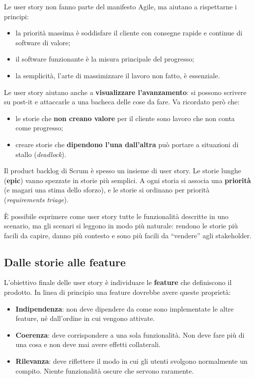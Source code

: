 Le user story non fanno parte del manifesto Agile, ma aiutano a
rispettarne i principi:

\begin{itemize}
\tightlist
\item
  la priorità massima è soddisfare il cliente con consegne rapide e
  continue di software di valore;
\item
  il software funzionante è la misura principale del progresso;
\item
  la semplicità, l'arte di massimizzare il lavoro non fatto, è
  essenziale.
\end{itemize}

Le user story aiutano anche a \textbf{visualizzare l'avanzamento}: si
possono scrivere su post-it e attaccarle a una bacheca delle cose da
fare. Va ricordato però che:

\begin{itemize}
\tightlist
\item
  le storie che \textbf{non creano valore} per il cliente sono lavoro
  che non conta come progresso;
\item
  creare storie che \textbf{dipendono l'una dall'altra} può portare a
  situazioni di stallo (\emph{deadlock}).
\end{itemize}

Il product backlog di Scrum è spesso un insieme di user story. Le storie
lunghe (\textbf{epic}) vanno spezzate in storie più semplici. A ogni
storia si associa una \textbf{priorità} (e magari una stima dello
sforzo), e le storie si ordinano per priorità (\emph{requirements
triage}).

È possibile esprimere come user story tutte le funzionalità descritte in
uno scenario, ma gli scenari si leggono in modo più naturale: rendono le
storie più facili da capire, danno più contesto e sono più facili da
``vendere'' agli stakeholder.

\subsection{Dalle storie alle feature}\label{dalle-storie-alle-feature}

L'obiettivo finale delle user story è individuare le \textbf{feature}
che definiscono il prodotto. In linea di principio una feature dovrebbe
avere queste proprietà:

\begin{itemize}
\tightlist
\item
  \textbf{Indipendenza}: non deve dipendere da come sono implementate le
  altre feature, né dall'ordine in cui vengono attivate.
\item
  \textbf{Coerenza}: deve corrispondere a una sola funzionalità. Non
  deve fare più di una cosa e non deve mai avere effetti collaterali.
\item
  \textbf{Rilevanza}: deve riflettere il modo in cui gli utenti svolgono
  normalmente un compito. Niente funzionalità oscure che servono
  raramente.
\end{itemize}


